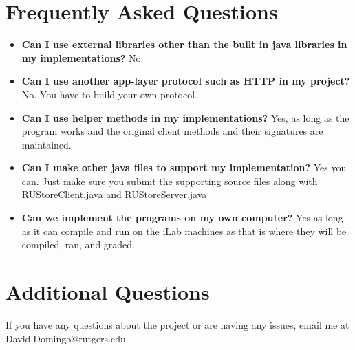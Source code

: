 \documentclass{article}
\begin{document}

\section*{Frequently Asked Questions}
\begin{itemize}
\item \textbf{Can I use external libraries other than the built in java libraries in my implementations?} No.
\item \textbf{Can I use another app-layer protocol such as HTTP in my project?} No. You have to build your own protocol.
\item \textbf{Can I use helper methods in my implementations?} Yes, as long as the program works and the original client methods and their signatures are maintained. 
\item \textbf{Can I make other java files to support my implementation?} Yes you can. Just make sure you submit the supporting source files along with RUStoreClient.java and RUStoreServer.java
\item \textbf{Can we implement the programs on my own computer?} Yes as long as it can compile and run on the iLab machines as that is where they will be compiled, ran, and graded. 
\end{itemize}








\section{Additional Questions} %
If you have any questions about the project or are having any issues, email me at David.Domingo@rutgers.edu

\end{document}
